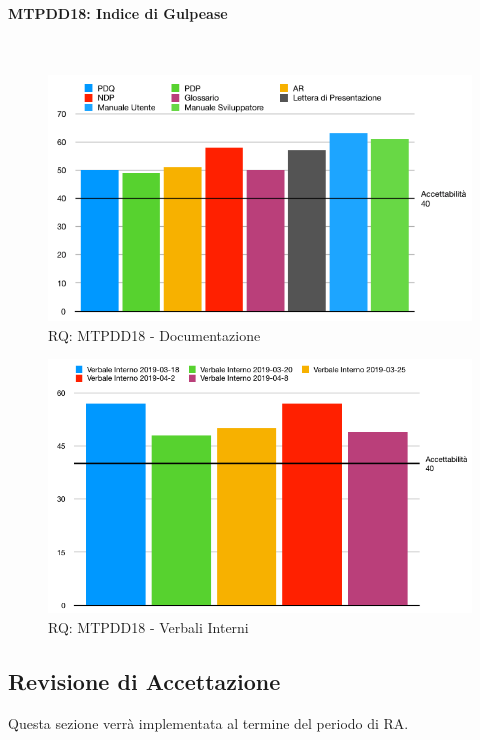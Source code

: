 \paragraph{MTPDD18: Indice di Gulpease}\-\\
\label{gulpi}

\begin{figure}[H]
	\begin{center}
		\includegraphics[scale=0.6]{./images/grafici_RQ/gulpeaseDocumenti.png} 
	\end{center}
	\caption{RQ: MTPDD18 - Documentazione}
\end{figure}

\begin{figure}[H]
	\begin{center}
		\includegraphics[scale=0.5]{./images/grafici_RQ/gulpeaseVerbali.png} 
	\end{center}
	\caption{RQ: MTPDD18 - Verbali Interni}
\end{figure}




\subsection{Revisione di Accettazione}
Questa sezione verrà implementata al termine del periodo di RA.

